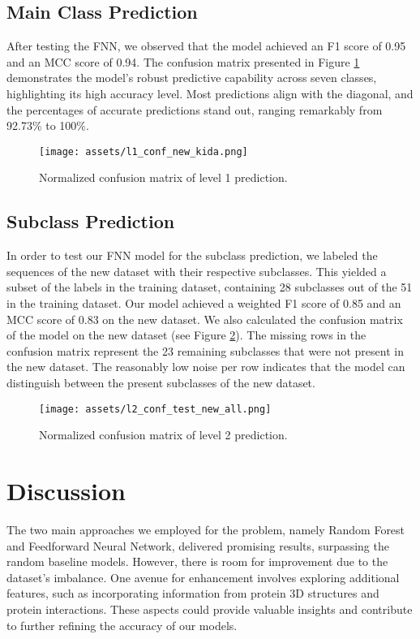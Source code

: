 \documentclass{bioinfo}
\begin{document}

\subsection{Main Class Prediction}
After testing the FNN, we observed that the model achieved an F1 score of 0.95 and an MCC score of 0.94. 
The confusion matrix presented in Figure \ref{fig:FNN_conf_l1} demonstrates the model's robust predictive capability across seven classes, 
highlighting its high accuracy level. Most predictions align with the diagonal, and the percentages of accurate predictions stand out, 
ranging remarkably from 92.73\% to 100\%.

\begin{figure}[!t]
\texttt{[image: assets/l1\_conf\_new\_kida.png]}
\caption{Normalized confusion matrix of level 1 prediction.}\label{fig:FNN_conf_l1}
\end{figure}

\subsection{Subclass Prediction}
In order to test our FNN model for the subclass prediction, we labeled the sequences of the new dataset with their respective subclasses.
This yielded a subset of the labels in the training dataset, containing 28 subclasses out of the 51 in the training dataset.
Our model achieved a weighted F1 score of 0.85 and an MCC score of 0.83 on the new dataset. 
We also calculated the confusion matrix of the model on the new dataset (see Figure \ref{fig:FNN_conf_l2}).
The missing rows in the confusion matrix represent the 23 remaining subclasses that were not present in the new dataset.
The reasonably low noise per row indicates that the model can distinguish between the present subclasses of the new dataset.


\begin{figure}[!b]
\texttt{[image: assets/l2\_conf\_test\_new\_all.png]}
\caption{Normalized confusion matrix of level 2 prediction.}\label{fig:FNN_conf_l2}
\end{figure}

\section{Discussion}
The two main approaches we employed for the problem, namely Random Forest and Feedforward Neural Network, delivered promising results, surpassing the random baseline models.
However, there is room for improvement due to the dataset's imbalance.
One avenue for enhancement involves exploring additional features, such as incorporating information from protein 3D structures and protein interactions.
These aspects could provide valuable insights and contribute to further refining the accuracy of our models.
\end{document}
